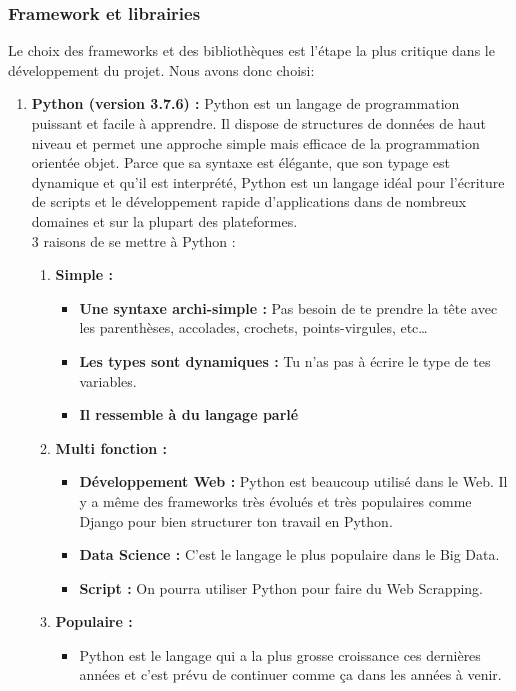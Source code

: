 \subsubsection{	Framework et librairies }
Le choix des frameworks et des bibliothèques est l'étape la plus critique dans le développement du projet. Nous avons donc choisi:
\begin{enumerate}
    \item \textbf{Python (version 3.7.6) \cite{python} : }
Python est un langage de programmation puissant et facile à apprendre. Il dispose de structures de données de haut niveau et permet une approche simple mais efficace de la programmation orientée objet. Parce que sa syntaxe est élégante, que son typage est dynamique et qu'il est interprété, Python est un langage idéal pour l'écriture de scripts et le développement rapide d'applications dans de nombreux domaines et sur la plupart des plateformes.\\
3 raisons de se mettre à Python \textbf{\cite{pythoncarac}}:
        \begin{enumerate}
            \item\textbf{Simple :}
                \begin{itemize}
                    \item\textbf{Une syntaxe archi-simple :} Pas besoin de te prendre la tête avec les parenthèses, accolades, crochets, points-virgules, etc…
                    \item\textbf{Les types sont dynamiques :} Tu n’as pas à écrire le type de tes variables.
                    \item\textbf{Il ressemble à du langage parlé} 
                \end{itemize}
            \item\textbf{Multi fonction :}
                \begin{itemize}
                    \item\textbf{Développement Web :} Python est beaucoup utilisé dans le Web. Il y a même des frameworks très évolués et très populaires comme Django pour bien structurer ton travail en Python.
                    \item\textbf{Data Science : }C’est le langage le plus populaire dans le Big Data.
                    \item\textbf{Script :} On pourra utiliser Python pour faire du Web Scrapping.
                \end{itemize}
            \item\textbf{Populaire :}
                \begin{itemize}
                    \item Python est le langage qui a la plus grosse croissance ces dernières années et c’est prévu de continuer comme ça dans les années à venir.
                \end{itemize}
        \end{enumerate}


\end{enumerate}
